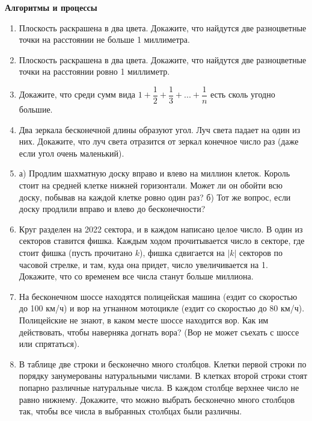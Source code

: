 \documentclass{article}
\begin{document}
\large
	
\begin{center}
	\textbf{Алгоритмы и процессы}
\end{center}

\begin{enumerate}[label*=\protect\fbox{\arabic{enumi}}]
	
\item Плоскость раскрашена в два цвета. Докажите, что найдутся две разноцветные точки на расстоянии не больше 1 миллиметра.

\item Плоскость раскрашена в два цвета. Докажите, что найдутся две разноцветные точки на расстоянии ровно 1 миллиметр.

\item Докажите, что среди сумм вида $1+\dfrac{1}{2} +\dfrac{1}{3}+...+\dfrac{1}{n}$ есть сколь угодно большие.

\item  Два зеркала бесконечной длины образуют угол. Луч света падает на один из них. Докажите, что луч света отразится от зеркал конечное число раз (даже если угол очень маленький).

\item
а) Продлим шахматную доску вправо и влево на миллион клеток. Король стоит на средней клетке нижней горизонтали. Может ли он обойти всю доску, побывав на каждой клетке ровно один раз?
б) Тот же вопрос, если доску продлили вправо и влево до бесконечности?

\item Круг разделен на 2022 сектора, и в каждом написано целое число. В один из секторов ставится фишка. Каждым ходом прочитывается число в секторе, где стоит фишка (пусть прочитано $k$), фишка сдвигается на $|k|$ секторов по часовой стрелке, и там, куда она придет, число увеличивается на 1. Докажите, что со временем все числа станут больше миллиона.

\item На бесконечном шоссе находятся полицейская машина (ездит со скоростью до 100 км/ч) и вор на угнанном мотоцикле (ездит со скоростью до 80 км/ч). Полицейские не знают, в каком месте шоссе находится вор. Как им действовать, чтобы наверняка догнать вора? (Вор не может съехать с шоссе или спрятаться).

\item В таблице две строки и бесконечно много столбцов. Клетки первой строки по порядку занумерованы натуральными числами. В клетках второй строки стоят попарно различные натуральные числа. В каждом столбце верхнее число не равно нижнему. Докажите, что можно выбрать бесконечно много столбцов так, чтобы все числа в выбранных столбцах были различны.


\end{enumerate}
\end{document}
